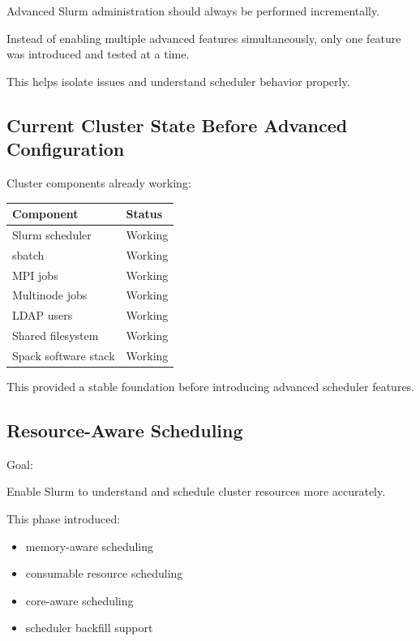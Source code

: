 \documentclass[11pt]{article}
\begin{document}
Advanced Slurm administration should always be performed incrementally.

Instead of enabling multiple advanced features simultaneously, only one
feature was introduced and tested at a time.

This helps isolate issues and understand scheduler behavior properly.
\subsection{Current Cluster State Before Advanced Configuration}
\label{sec:orgaec8fe9}

Cluster components already working:

\begin{center}
\begin{tabular}{ll}
Component & Status\\
\hline
Slurm scheduler & Working\\
sbatch & Working\\
MPI jobs & Working\\
Multinode jobs & Working\\
LDAP users & Working\\
Shared filesystem & Working\\
Spack software stack & Working\\
\end{tabular}
\end{center}

This provided a stable foundation before introducing advanced scheduler
features.
\subsection{Resource-Aware Scheduling}
\label{sec:org76fa42b}

Goal:

Enable Slurm to understand and schedule cluster resources more accurately.

This phase introduced:

\begin{itemize}
\item memory-aware scheduling
\item consumable resource scheduling
\item core-aware scheduling
\item scheduler backfill support
\end{itemize}
\end{document}
